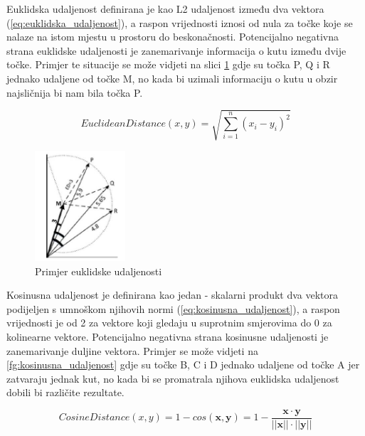 \documentclass[times, utf8, proizvoljni, numeric]{fer}
\begin{document}
Euklidska udaljenost definirana je kao L2 udaljenost između dva vektora (\ref{eq:euklidska_udaljenost}), a raspon vrijednosti iznosi od nula za točke koje se nalaze na istom mjestu u prostoru do beskonačnosti. Potencijalno negativna strana euklidske udaljenosti je zanemarivanje informacija o kutu između dvije točke. Primjer te situacije se može vidjeti na slici \ref{fg:euklidska_udaljenost} gdje su točka P, Q i R jednako udaljene od točke M, no kada bi uzimali informaciju o kutu u obzir najsličnija bi nam bila točka P.

\begin{equation}
\label{eq:euklidska_udaljenost}
EuclideanDistance(x,y) = \sqrt{\sum_{i=1}^n (x_i-y_i)^2}    
\end{equation}

\begin{figure}[!ht]
	\begin{center}
		\captionsetup{justification=centering}
		\includegraphics[width=0.3\textwidth]{./imgs/euklidska_udaljenost.png}
		\caption{Primjer euklidske udaljenosti \cite{VectorSimilarity}}
		\label{fg:euklidska_udaljenost}
	\end{center}
\end{figure}

Kosinusna udaljenost je definirana kao jedan - skalarni produkt dva vektora podijeljen s umnoškom njihovih normi (\ref{eq:kosinusna_udaljenost}), a raspon vrijednosti je od 2 za vektore koji gledaju u suprotnim smjerovima do 0 za kolinearne vektore. Potencijalno negativna strana kosinusne udaljenosti je zanemarivanje duljine vektora. Primjer se može vidjeti na \ref{fg:kosinusna_udaljenost} gdje su točke B, C i D jednako udaljene od točke A jer zatvaraju jednak kut, no kada bi se promatrala njihova euklidska udaljenost dobili bi različite rezultate.

\begin{equation}
\label{eq:kosinusna_udaljenost}
CosineDistance(x,y) = 1- cos(\pmb x, \pmb y) = 1 - \frac {\pmb x \cdot \pmb y}{||\pmb x|| \cdot ||\pmb y||}
\end{equation}
\end{document}
